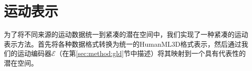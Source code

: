 \section{运动表示}
\label{sec:method:m_rep}
为了将不同来源的运动数据统一到紧凑的潜在空间中，我们实现了一种紧凑的运动表示方法。首先将各种数据格式转换为统一的HumanML3D格式表示，然后通过我们的运动编码器$\mathcal{E}$（在第\ref{sec:method:gld}节中描述）将其映射到一个具有代表性的潜在空间。

